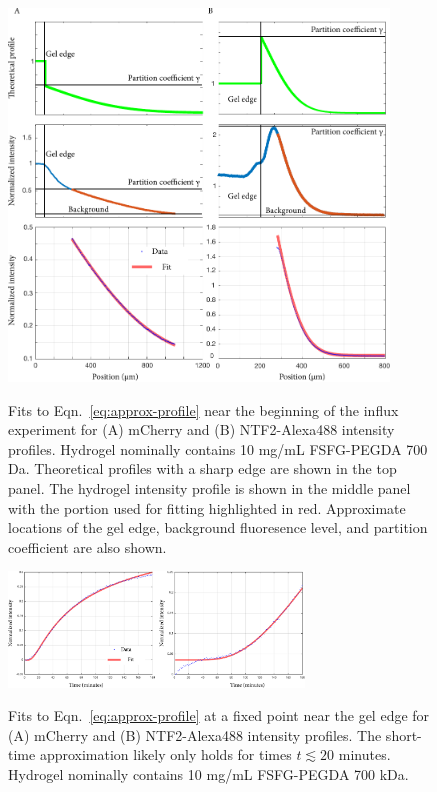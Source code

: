 \begin{figure}
\caption[Fits to concentration profiles at a fixed time.]{Fits to Eqn.~\ref{eq:approx-profile} near the beginning of the influx experiment for (A) mCherry and (B) NTF2-Alexa488 intensity profiles.  Hydrogel nominally contains 10 mg/mL FSFG-PEGDA 700 Da.  Theoretical profiles with a sharp edge are shown in the top panel.  The hydrogel intensity profile is shown in the middle panel with the portion used for fitting highlighted in red.  Approximate locations of the gel edge, background fluoresence level, and partition coefficient are also shown.}
\centering
\includegraphics[width=0.9\textwidth]{figs/ch04/mCherry-erfc-position.pdf}
\label{fig:erfc-position}
\end{figure} 

\begin{figure}
\caption[Fits to concentration profiles at a fixed position.]{Fits to Eqn.~\ref{eq:approx-profile} at a fixed point near the gel edge for (A) mCherry and (B) NTF2-Alexa488 intensity profiles.  The short-time approximation likely only holds for times $t \lesssim 20$ minutes. Hydrogel nominally contains 10 mg/mL FSFG-PEGDA 700 kDa.}
\centering
\includegraphics[width=0.7\textwidth]{figs/ch04/erfc-time.pdf}
\label{fig:erfc-time}
\end{figure} 

